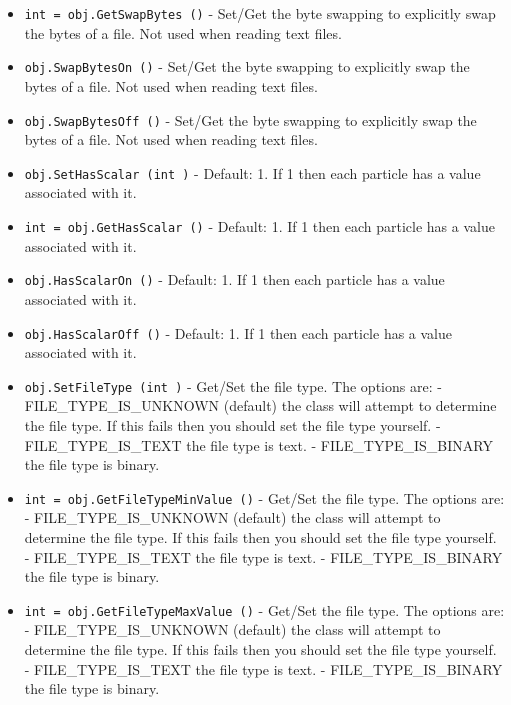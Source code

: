 \begin{itemize}
\item  \verb|int = obj.GetSwapBytes ()| -  Set/Get the byte swapping to explicitly swap the bytes of a file.
 Not used when reading text files.

\item  \verb|obj.SwapBytesOn ()| -  Set/Get the byte swapping to explicitly swap the bytes of a file.
 Not used when reading text files.

\item  \verb|obj.SwapBytesOff ()| -  Set/Get the byte swapping to explicitly swap the bytes of a file.
 Not used when reading text files.

\item  \verb|obj.SetHasScalar (int )| -  Default: 1. If 1 then each particle has a value associated with it.

\item  \verb|int = obj.GetHasScalar ()| -  Default: 1. If 1 then each particle has a value associated with it.

\item  \verb|obj.HasScalarOn ()| -  Default: 1. If 1 then each particle has a value associated with it.

\item  \verb|obj.HasScalarOff ()| -  Default: 1. If 1 then each particle has a value associated with it.

\item  \verb|obj.SetFileType (int )| -  Get/Set the file type.  The options are:
 - FILE\_TYPE\_IS\_UNKNOWN (default) the class 
     will attempt to determine the file type.
     If this fails then you should set the file type
     yourself.
 - FILE\_TYPE\_IS\_TEXT the file type is text.
 - FILE\_TYPE\_IS\_BINARY the file type is binary.

\item  \verb|int = obj.GetFileTypeMinValue ()| -  Get/Set the file type.  The options are:
 - FILE\_TYPE\_IS\_UNKNOWN (default) the class 
     will attempt to determine the file type.
     If this fails then you should set the file type
     yourself.
 - FILE\_TYPE\_IS\_TEXT the file type is text.
 - FILE\_TYPE\_IS\_BINARY the file type is binary.

\item  \verb|int = obj.GetFileTypeMaxValue ()| -  Get/Set the file type.  The options are:
 - FILE\_TYPE\_IS\_UNKNOWN (default) the class 
     will attempt to determine the file type.
     If this fails then you should set the file type
     yourself.
 - FILE\_TYPE\_IS\_TEXT the file type is text.
 - FILE\_TYPE\_IS\_BINARY the file type is binary.


\end{itemize}
